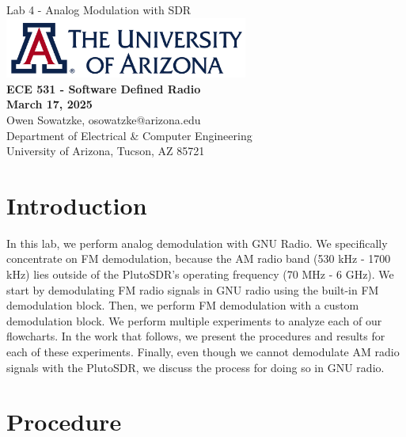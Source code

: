 \documentclass{article}
\begin{document}
\begin{titlepage}
	\centering
	{\huge Lab 4 - Analog Modulation with SDR}\\[0.25 in]
	\includegraphics[width=0.6\textwidth]{ua_logo.png}\\[0.25 in]
	{\large \textbf{ECE 531 - Software Defined Radio\\[0.25 in]
	March 17, 2025\\[0.25 in]}}
	{\large Owen Sowatzke, osowatzke@arizona.edu\\[0.05 in]
	Department of Electrical \& Computer Engineering\\[0.05 in]
	University of Arizona, Tucson, AZ 85721\\[0.5 in]}
	\hypersetup{linkcolor=navy-blue}
	\noindent\hrulefill
	\tableofcontents
	\noindent\hrulefill
\end{titlepage}


\section{Introduction}

In this lab, we perform analog demodulation with GNU Radio. We specifically concentrate on FM demodulation, because the AM radio band (530 kHz - 1700 kHz) lies outside of the PlutoSDR's operating frequency (70 MHz - 6 GHz). We start by demodulating FM radio signals in GNU radio using the built-in FM demodulation block. Then, we perform FM demodulation with a custom demodulation block. We perform multiple experiments to analyze each of our flowcharts. In the work that follows, we present the procedures and results for each of these experiments. Finally, even though we cannot demodulate AM radio signals with the PlutoSDR, we discuss the process for doing so in GNU radio.  

\section{Procedure}
\end{document}
